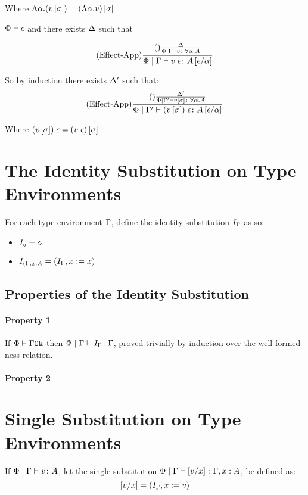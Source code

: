 {    Where $\elam{\a}{(v\ssi)} = (\elam{\a}{v})\ssi$


    \bi $\wellformed{\P}{\e}$ and there exists $\D$ such that

    \begin{equation}
        \treerule{Effect-App}{\treerule{}{\D}{\etyperelation{\P}{\G}{v}{\all{\a}{A}}}}{\etyperelation{\P}{\G}{\eapp{v}{\e}}{A\ssub{\a}{\e}}}
    \end{equation}

    So by induction there exists $\D'$ such that:
    \begin{equation}
        \treerule{Effect-App}{\treerule{}{\D'}{\etyperelation{\P}{\G'}{v\ssi}{\all{\a}{A}}}}{\etyperelation{\P}{\G'}{\eapp{(v\ssi)}{\e}}{A\ssub{\a}{\e}}}
    \end{equation}

    Where $\eapp{(v\ssi)}{\e} = (\eapp{v}{\e})\ssi$

    \section{The Identity Substitution on Type Environments}
    For each type environment $\G$, define the identity substitution $I_{\G}$ as so:

    \begin{itemize}
        \item $I_{\nil} = \nil$
        \item $I_{(\gax} = (I_{\G}, x\setto x)$
    \end{itemize}

    \subsection{Properties of the Identity Substitution}
    \paragraph{Property 1}
    If $\wellformedok{\P}{\G}$ then $\etyperelation{\P}{\G}{I_{\G}}{\G}$, proved trivially by induction over the well-formed-ness relation.

    \paragraph{Property 2}
    \section{Single Substitution on Type Environments}

    If $\etyperelation{\P}{\G}{v}{A}$, let the single substitution $\etyperelation{\P}{\G}{\ssub{x}{v}}{\gax}$, be defined as:
    \begin{equation}
        \ssub{x}{v} = (I_{\G}, x\setto v)
    \end{equation}
    
    
}


\ifdefined\NoDocument
\else
\documentclass{report}


    \Substitution

\fi